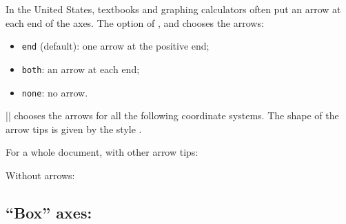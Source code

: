 In the United States, textbooks and graphing calculators often put an arrow at each end of the axes. The option  of ,  and  chooses the arrows:
\begin{itemize}
  \item \texttt{end} (default): one arrow at the positive end;
  \item \texttt{both}: an arrow at each end;
  \item \texttt{none}: no arrow.
\end{itemize}
|| chooses the arrows for all the following coordinate systems. The shape of the arrow tips is given by the style .

\begin{tkzexample}[latex=7cm]
\end{tkzexample}

For a whole document, with other arrow tips:

\begin{tkzexample}[latex=7cm]
\end{tkzexample}

Without arrows:

\begin{tkzexample}[latex=7cm]
\end{tkzexample}

\newpage
\subsection{``Box'' axes: }\label{sec:box}

